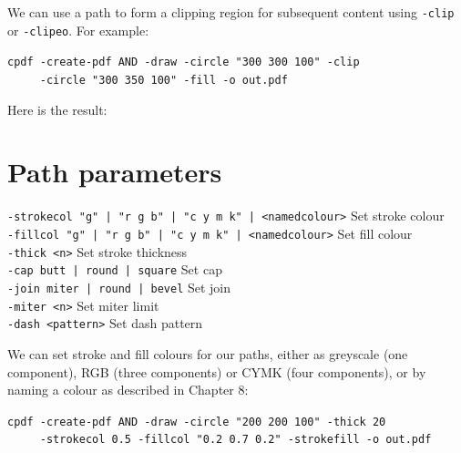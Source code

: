 \documentclass{book}
\begin{document}
\noindent We can use a path to form a clipping region for subsequent content using \texttt{-clip} or \texttt{-clipeo}. For example: 

\begin{framed}
 \noindent\small\verb?cpdf -create-pdf AND -draw -circle "300 300 100" -clip?\\
 \noindent\small\verb?     -circle "300 350 100" -fill -o out.pdf?
\end{framed}

\noindent Here is the result:

\bigskip
{}
\bigskip

\section{Path parameters}
  {\small\begin{framed}
   \noindent\verb!-strokecol "g" | "r g b" | "c y m k" | <namedcolour>! Set stroke colour\\
   \noindent\verb!-fillcol "g" | "r g b" | "c y m k" | <namedcolour>! Set fill colour\\
   \noindent\verb!-thick <n>! Set stroke thickness\\
   \noindent\verb!-cap butt | round | square! Set cap\\
   \noindent\verb!-join miter | round | bevel! Set join\\
   \noindent\verb!-miter <n>! Set miter limit\\
   \noindent\verb!-dash <pattern>! Set dash pattern
  \end{framed}}

We can set stroke and fill colours for our paths, either as greyscale (one component), RGB (three components) or CYMK (four components), or by naming a colour as described in Chapter 8:

\begin{framed}
 \noindent\small\verb?cpdf -create-pdf AND -draw -circle "200 200 100" -thick 20?\\
 \noindent\small\verb?     -strokecol 0.5 -fillcol "0.2 0.7 0.2" -strokefill -o out.pdf?
\end{framed}
\end{document}
